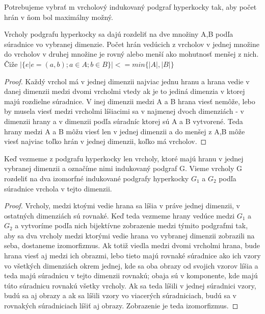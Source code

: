 Potrebujeme vybrať m vrcholový indukovaný podgraf hyperkocky tak, aby počet 
hrán v ňom bol maximálny možný.

\begin{lem}
Vrcholy podgrafu hyperkocky sa dajú rozdeliť na dve množiny A,B podľa súradnice vo
vybranej dimenzie. Počet hrán vedúcich z vrcholov v jednej množine do
vrcholov v druhej množine je rovný alebo menší ako mohutnosť menšej z nich.
Čiže $|\{e|e = (a,b);a \in A; b \in B\}| <= min\{|A|,|B|\}$
\end{lem}
\begin{proof}
Každý vrchol má v jednej dimenzii najviac jednu hranu a hrana vedie v
danej dimenzii medzi dvomi vrcholmi vtedy ak je to jediná dimenzia v ktorej
majú rozdielne súradnice. V inej dimenzii medzi A a B hrana viesť nemôže,
lebo by musela viesť medzi vrcholmi líšiacimi sa v najmenej dvoch 
dimenziách - v dimenzii hrany a v dimenzii podľa súradníc ktorej 
sú A a B vytvorené. Teda hrany medzi A a B môžu viesť len v jednej dimenzii
a do menšej z A,B môže viesť najviac toľko hrán v jednej dimenzii, koľko má
vrcholov.
\end{proof}

\begin{lem}
\label{izomorfne}
Keď vezmeme z podgrafu hyperkocky len vrcholy, ktoré majú hranu v jednej
vybranej dimenzii a označíme nimi indukovaný podgraf G. Vieme vrcholy G
rozdeliť na dva izomorfné indukované podgrafy hyperkocky $G_{1}$ a $G_{2}$
podľa súradnice vrchola v tejto dimenzii.
\end{lem}

\begin{proof}
Vrcholy, medzi ktoými vedie hrana sa líšia v práve jednej dimenzii, v
ostatných dimenziách sú rovnaké. Keď teda vezmeme hrany vedúce medzi 
$G_{1}$ a $G_{2}$ a vytvoríme podľa nich bijektívne zobrazenie medzi týmito
podgrafmi tak, aby sa dva vrcholy medzi ktorými vedie hrana vo vybranej
dimenzii zobrazili na seba, dostaneme izomorfizmus. Ak totiž viedla medzi
dvomi vrcholmi hrana, bude hrana viesť aj medzi ich obrazmi, lebo tieto majú
rovnaké súradnice ako ich vzory vo všetkých dimenziách okrem jednej, kde sa
oba obrazy od svojich vzorov líšia a teda majú súradnicu v tejto dimenzii 
rovnakú; obaja sú v komponente, kde majú túto súradnicu rovnakú všetky
vrcholy. Ak sa teda líšili v jednej súradnici vzory, budú sa aj obrazy a ak
sa líšili vzory vo viacerých súradniciach, budú sa v rovnakých súradniciach
líšiť aj obrazy. Zobrazenie  je teda izomorfizmus.
\end{proof}

